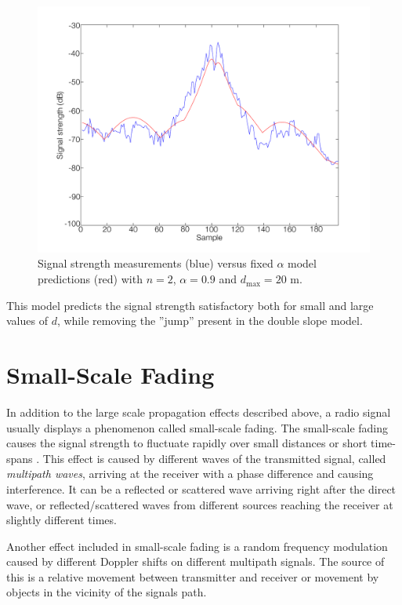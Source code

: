 \documentclass{LTHthesis}
\begin{document}
 \begin{figure}[!hbt]

\includegraphics[width=1\textwidth ]{images/signal_model/fixed_alpha}
\caption{Signal strength measurements (blue) versus fixed $\alpha$ model predictions (red) with $n=2$, $\alpha=0.9$ and $d_{\text{max}}=20$ m.}\label{fixed_alpha}
\end{figure}

This model predicts the signal strength satisfactory both for small and large values of $d$, while removing the ''jump'' present in the double slope model.
 \section{Small-Scale Fading}
In addition to the large scale propagation effects described above, a radio signal usually displays a phenomenon called small-scale fading. The small-scale fading causes the signal strength to fluctuate rapidly over small distances or short time-spans \cite{rappaport96}. This effect is caused by different waves of the transmitted signal, called \emph{multipath waves}, arriving at the receiver with a phase difference and causing interference. It can be a reflected or scattered wave arriving right after the direct wave, or reflected/scattered waves from different sources reaching the receiver at slightly different times. 

Another effect included in small-scale fading is a random frequency modulation caused by different Doppler shifts on different multipath signals. The source of this is a relative movement between transmitter and receiver or movement by objects in the vicinity of the signals path. 
\end{document}
